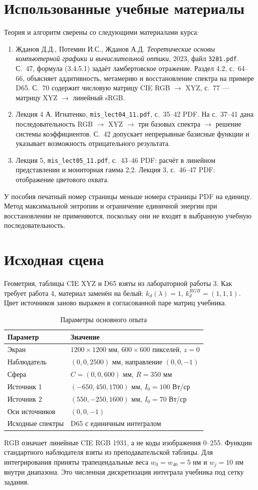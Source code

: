 \documentclass[a4paper,12pt]{article}
\newcommand{\code}[1]{\nolinkurl{#1}}
\begin{document}
\section{Использованные учебные материалы}
Теория и алгоритм сверены со следующими материалами курса:
\begin{enumerate}
\item Жданов Д.Д., Потемин И.С., Жданов А.Д. \emph{Теоретические основы компьютерной графики и вычислительной оптики}, 2023, файл \code{3281.pdf}. С.~47, формула (3.4.5.1) задаёт ламбертовское отражение. Раздел 4.2, с.~64--66, объясняет аддитивность, метамерию и восстановление спектра на примере D65. С.~70 содержит числовую матрицу CIE RGB $\to$ XYZ, с.~77 --- матрицу XYZ $\to$ линейный sRGB.
\item Лекция 4 А. Игнатенко, \code{mis_lect04_11.pdf}, с.~35--42 PDF. На с.~37--41 дана последовательность RGB $\to$ XYZ $\to$ три базовых спектра $\to$ решение системы коэффициентов. С.~42 допускает непрерывные базисные функции и указывает возможность отрицательного результата.
\item Лекция 5, \code{mis_lect05_11.pdf}, с.~43--46 PDF: расчёт в линейном представлении и мониторная гамма 2,2. Лекция 3, с.~46--47 PDF: отображение цветового охвата.
\end{enumerate}
У пособия печатный номер страницы меньше номера страницы PDF на единицу. Метод максимальной энтропии и ограничение единичной энергии при восстановлении не применяются, поскольку они не входят в выбранную учебную последовательность.

\section{Исходная сцена}
Геометрия, таблицы CIE XYZ и D65 взяты из лабораторной работы 3. Как требует работа 4, материал заменён на белый: $k_d(\lambda)=1$, $k_d^{RGB}=(1,1,1)$. Цвет источников заново выражен в согласованной паре матриц учебника.
\begin{table}[H]\centering\small
\caption{Параметры основного опыта}
\begin{tabularx}{\textwidth}{@{}lX@{}}\toprule
Параметр & Значение\\\midrule
Экран & $1200\times1200$ мм, $600\times600$ пикселей, $z=0$\\
Наблюдатель & $(0,0,2500)$ мм, направление $(0,0,-1)$\\
Сфера & $C=(0,0,600)$ мм, $R=350$ мм\\
Источник 1 & $(-650,450,1700)$ мм, $I_0=100$ Вт/ср\\
Источник 2 & $(550,-250,1600)$ мм, $I_0=70$ Вт/ср\\
Оси источников & $(0,0,-1)$\\
Исходные спектры & D65 с единичным интегралом\\\bottomrule
\end{tabularx}\end{table}

RGB означает линейные CIE RGB 1931, а не коды изображения 0--255. Функции стандартного наблюдателя взяты из преподавательской таблицы. Для интегрирования приняты трапецеидальные веса $w_0=w_{40}=5$ нм и $w_j=10$ нм внутри диапазона. Это численная дискретизация интеграла учебника под сетку задания.
\end{document}
